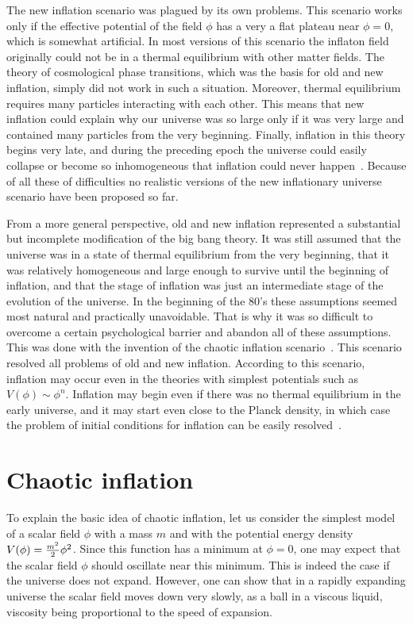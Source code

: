 \documentclass[a4paper,12pt]{article}
\begin{document}
The new inflation scenario was plagued by its own problems. This scenario
works only if the effective potential of the field $\phi$ has a very a
flat plateau near $\phi = 0$, which  is somewhat  artificial. In most
versions of this scenario the inflaton field originally could not be in a
thermal equilibrium with other matter fields. The theory of cosmological
phase transitions, which was the basis for old and new inflation, simply
did not work in such a situation. Moreover,   thermal equilibrium
requires many particles interacting with each other. This means that new
inflation could explain why our universe was so large only if it was very
large and contained many particles from the very beginning. Finally,
inflation in this theory begins very late, and during the preceding epoch
the universe could easily collapse or become so inhomogeneous that
inflation could never happen~\cite{book}. Because of all these of difficulties
no realistic versions of the new inflationary universe   scenario have
been proposed so far.

 From a more general perspective, old and new inflation represented  a
substantial but  incomplete modification of the big bang theory. It was
still assumed that the universe was in a state of thermal equilibrium
from the very beginning, that it was relatively homogeneous and large
enough to survive until the beginning of inflation, and that the stage of
inflation was just an intermediate stage of the evolution of the
universe. In the beginning of the 80's these assumptions seemed most
natural and practically unavoidable. That is why it was so difficult to
overcome a certain psychological barrier and abandon all of these
assumptions. This was done with the invention of the chaotic inflation
scenario~\cite{Chaot}. This scenario resolved all   problems of old and
new inflation. According to this scenario, inflation may occur even in
the theories with simplest potentials such as $V(\phi) \sim  \phi^n$.
Inflation may begin even if there was no thermal equilibrium in the early
universe, and it may start even close to the Planck density, in which case
the problem of initial conditions for inflation can be easily resolved~\cite{book}.


\section{Chaotic inflation}

To explain the basic idea of chaotic inflation, let us consider  the
simplest model of a scalar field $\phi$ with a mass $m$ and with the
potential energy density $V(\phi)  = {m^2\over 2} \phi^2$.
Since this function has a minimum at $\phi = 0$,  one may expect that the
scalar field $\phi$ should oscillate near this minimum. This is indeed
the case if the universe does not expand. However, one can show that in a
rapidly expanding universe  the scalar field moves down very slowly, as a
ball in a viscous liquid, viscosity being proportional to the speed of
expansion.
\end{document}
